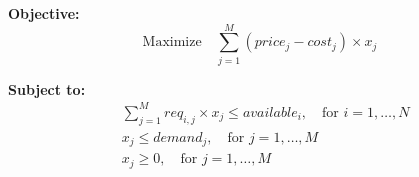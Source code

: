 \documentclass{article}
\begin{document}
\textbf{Objective:}
\[
\text{Maximize} \quad \sum_{j=1}^{M} (price_j - cost_j) \times x_j
\]

\textbf{Subject to:}
\begin{align*}
& \sum_{j=1}^{M} req_{i,j} \times x_j \leq available_i, \quad \text{for } i = 1, \ldots, N \\
& x_j \leq demand_j, \quad \text{for } j = 1, \ldots, M \\
& x_j \geq 0, \quad \text{for } j = 1, \ldots, M
\end{align*}
\end{document}
